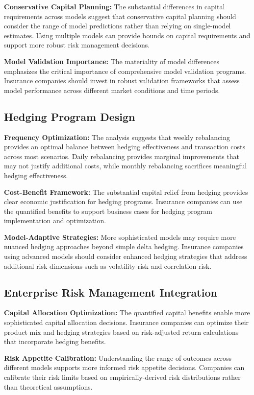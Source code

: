 \documentclass[12pt,a4paper]{report}
\begin{document}
\textbf{Conservative Capital Planning:} The substantial differences in capital requirements across models suggest that conservative capital planning should consider the range of model predictions rather than relying on single-model estimates. Using multiple models can provide bounds on capital requirements and support more robust risk management decisions.

\textbf{Model Validation Importance:} The materiality of model differences emphasizes the critical importance of comprehensive model validation programs. Insurance companies should invest in robust validation frameworks that assess model performance across different market conditions and time periods.

\subsection{Hedging Program Design}

\textbf{Frequency Optimization:} The analysis suggests that weekly rebalancing provides an optimal balance between hedging effectiveness and transaction costs across most scenarios. Daily rebalancing provides marginal improvements that may not justify additional costs, while monthly rebalancing sacrifices meaningful hedging effectiveness.

\textbf{Cost-Benefit Framework:} The substantial capital relief from hedging provides clear economic justification for hedging programs. Insurance companies can use the quantified benefits to support business cases for hedging program implementation and optimization.

\textbf{Model-Adaptive Strategies:} More sophisticated models may require more nuanced hedging approaches beyond simple delta hedging. Insurance companies using advanced models should consider enhanced hedging strategies that address additional risk dimensions such as volatility risk and correlation risk.

\subsection{Enterprise Risk Management Integration}

\textbf{Capital Allocation Optimization:} The quantified capital benefits enable more sophisticated capital allocation decisions. Insurance companies can optimize their product mix and hedging strategies based on risk-adjusted return calculations that incorporate hedging benefits.

\textbf{Risk Appetite Calibration:} Understanding the range of outcomes across different models supports more informed risk appetite decisions. Companies can calibrate their risk limits based on empirically-derived risk distributions rather than theoretical assumptions.
\end{document}
